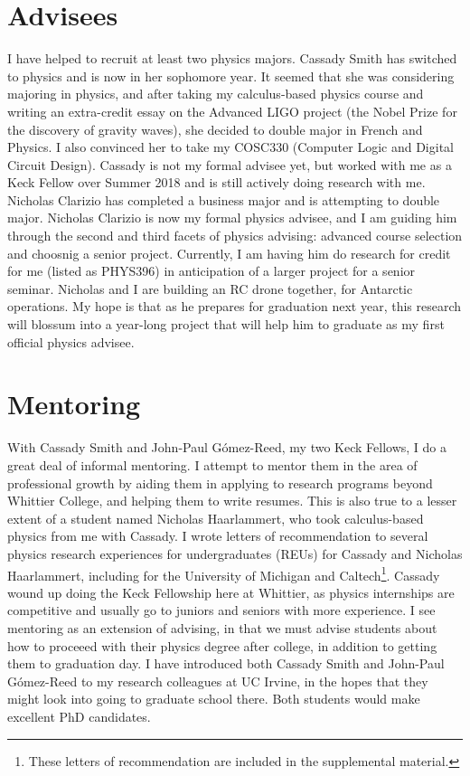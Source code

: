 \documentclass[../main.tex]{subfiles}
\begin{document}
\section{Advisees}

I have helped to recruit at least two physics majors.  Cassady Smith has switched to physics and is now in her sophomore year.  It seemed that she was considering majoring in physics, and after taking my calculus-based physics course and writing an extra-credit essay on the Advanced LIGO project (the Nobel Prize for the discovery of gravity waves), she decided to double major in French and Physics.  I also convinced her to take my COSC330 (Computer Logic and Digital Circuit Design).  Cassady is not my formal advisee yet, but worked with me as a Keck Fellow over Summer 2018 and is still actively doing research with me.  Nicholas Clarizio has completed a business major and is attempting to double major.  Nicholas Clarizio is now my formal physics advisee, and I am guiding him through the second and third facets of physics advising: advanced course selection and choosnig a senior project.  Currently, I am having him do research for credit for me (listed as PHYS396) in anticipation of a larger project for a senior seminar.  Nicholas and I are building an RC drone together, for Antarctic operations.  My hope is that as he prepares for graduation next year, this research will blossum into a year-long project that will help him to graduate as my first official physics advisee. \\ \hspace{0.1cm}

\section{Mentoring}

With Cassady Smith and John-Paul G\'{o}mez-Reed, my two Keck Fellows, I do a great deal of informal mentoring.  I attempt to mentor them in the area of professional growth by aiding them in applying to research programs beyond Whittier College, and helping them to write resumes.  This is also true to a lesser extent of a student named Nicholas Haarlammert, who took calculus-based physics from me with Cassady.  I wrote letters of recommendation to several physics research experiences for undergraduates (REUs) for Cassady and Nicholas Haarlammert, including for the University of Michigan and Caltech\footnote{These letters of recommendation are included in the supplemental material.}.  Cassady wound up doing the Keck Fellowship here at Whittier, as physics internships are competitive and usually go to juniors and seniors with more experience.  I see mentoring as an extension of advising, in that we must advise students about how to proceeed with their physics degree after college, in addition to getting them to graduation day.  I have introduced both Cassady Smith and John-Paul G\'{o}mez-Reed to my research colleagues at UC Irvine, in the hopes that they might look into going to graduate school there.  Both students would make excellent PhD candidates. \\ \hspace{0.1cm}
\end{document}
